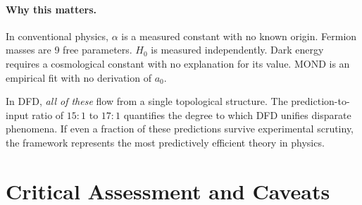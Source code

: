 \documentclass[12pt,a4paper]{article}
\begin{document}
\paragraph{Why this matters.}
In conventional physics, $\alpha$ is a measured constant with no known
origin.  Fermion masses are 9 free parameters.  $H_0$ is measured
independently.  Dark energy requires a cosmological constant with no
explanation for its value.  MOND is an empirical fit with no derivation
of $a_0$.

In DFD, \textit{all of these} flow from a single topological structure.
The prediction-to-input ratio of $15{:}1$ to $17{:}1$ quantifies the
degree to which DFD unifies disparate phenomena.  If even a fraction of
these predictions survive experimental scrutiny, the framework represents
the most predictively efficient theory in physics.

\section{Critical Assessment and Caveats}
\label{sec:caveats}
\end{document}
